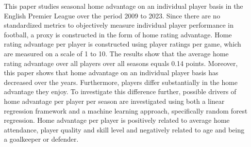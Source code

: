 \noindent
This paper studies seasonal home advantage on an individual player basis in the English Premier League over the period 2009 to 2023. Since there are no standardized metrics to objectively measure individual player performance in football, a proxy is constructed in the form of home rating advantage. Home rating advantage per player is constructed using player ratings per game, which are measured on a scale of 1 to 10. The results show that the average home rating advantage over all players over all seasons equals 0.14 points. Moreover, this paper shows that home advantage on an individual player basis has decreased over the years. Furthermore, players differ substantially in the home advantage they enjoy. To investigate this difference further, possible drivers of home advantage per player per season are investigated using both a linear regression framework and a machine learning approach, specifically random forest regression. Home advantage per player is positively related to average home attendance, player quality and skill level and negatively related to age and being a goalkeeper or defender.